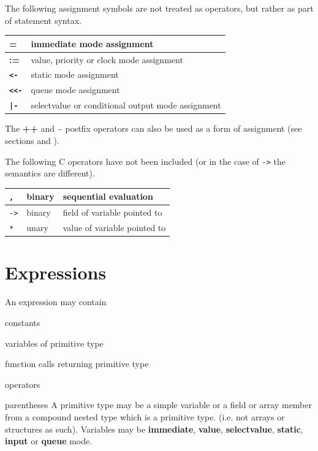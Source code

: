         The following assignment symbols are not treated as operators, but
        rather as part of statement syntax.
        
        \begin{tabular}{| l | l |}
        \hline
        {\bf =}          & immediate mode assignment \\
        \hline
        {\bf :=}         & value, priority or clock mode assignment \\
        \hline
        {\bf \verb'<-'}  & static mode assignment \\
        \hline
        {\bf \verb'<<-'} & queue mode assignment \\
        \hline
        {\bf \verb'|-'}  & selectvalue or conditional output mode assignment \\
        \hline
        \end{tabular}
        
        The {\bf ++} and {\bf --} postfix
        operators can also be used as a form of assignment (see sections
         and ).

        The following C operators have not been included (or in the case of
        \verb'->' the semantics are different).

        \begin{tabular}{| l | l | l |}
        \hline
        \verb',' & binary & sequential evaluation \\
        \hline
        \verb'->' & binary & field of variable pointed to \\
        \hline
        \verb'*' & unary & value of variable pointed to \\
        \hline
        \end{tabular}



    \section{Expressions}

        An expression may contain
        \blist
        \item   constants
        \item   variables of primitive type
        \item   function calls returning primitive type
        \item   operators
        \item   parentheses
        \blend
        A primitive type may be a simple variable or a field or array member
        from a compound nested type which is a primitive type. (i.e. not
        arrays or structures as such). Variables may be {\bf immediate}, {\bf
        value}, {\bf selectvalue}, {\bf static}, {\bf input} or {\bf queue} mode.

